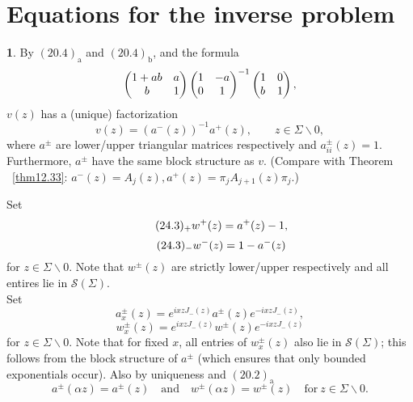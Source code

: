 \documentclass{surv-l}
\theoremstyle{plain}
\theoremstyle{definition}
\newtheorem{definition}[theorem]{\sc{Definition}}
\numberwithin{equation}{chapter}
\begin{document}
\section{Equations for the inverse problem}\label{sec24}
\setcounter{theorem}{0}
\begin{definition}\label{defi24.1}
By $(20.4)_{\mathrm{a}}$ and $(20.4)_{\mathrm{b}}$, and the formula
\begin{equation*}
\left(\begin{array}{@{}cc@{}}
1+ab & a \\
b & 1
\end{array}\right)\left(\begin{array}{@{}cc@{}}
1 & -a\\
0 & 1
\end{array}\right)^{-1} \left(\begin{array}{@{}ll@{}}
1 & 0\\
b & 1
\end{array}\right),
\end{equation*}
$v(z)$ has a (unique) factorization
\renewcommand\theequation{24.2}
\setcounter{equation}{1}
\begin{equation}\label{eq24.2}
v(z)=(a^{-}(z))^{-1}a^{+}(z),\qquad z\in\Sigma\backslash 0,
\end{equation}
where $a^{\pm}$ are lower/upper triangular matrices respectively and $a_{ii}^{\pm}(z)=1$. Furthermore, $a^{\pm}$ have the same block structure as $v$. (Compare with Theorem ~\ref{thm12.33}: $a^{-}(z) =A_{j}(z), a^{+}(z)=\pi_{j}A_{j+1}(z)\pi_{j}.$)

Set
\begin{equation*}
\tag*{$(24.3)_{+}$}  w^{+}(z)=a^{+}(z)-1,
\end{equation*}
\begin{equation*}
\tag*{$(24.3)_{-}$}  w^{-}(z)=1-a^{-}(z)
\end{equation*}
for $z\in\Sigma\backslash0$. Note that $w^{\pm}(z)$ are strictly lower/upper respectively and all entires lie in $\mathscr{S}(\Sigma)$.\\
Set
\renewcommand{\theequation}{\thesection.\arabic{equation}}
\setcounter{equation}{3}
\begin{equation}\label{eq24.4}
a_{x}^{\pm}(z) = e^{ixzJ_{-}(z)}a^{\pm}(z)e^{-ixzJ_{-}(z)},
\end{equation}
\begin{equation}\label{eq24.5}
w_{x}^{\pm}(z) = e^{ixzJ_{-}(z)}w^{\pm}(z)e^{-ixzJ_{-}(z)}
\end{equation}
for $z\in\Sigma\backslash 0$. Note that for fixed $x$, all entries of $w_{x}^{\pm}(z)$ also lie in $\mathscr{S}(\Sigma)$; this follows from the block structure of $a^{\pm}$ (which ensures that only bounded exponentials occur). Also by uniqueness and $(20.2)_{\mathrm{a}}$
\begin{equation}\label{eq24.6}
a^{\pm}(\alpha z)=a^{\pm}(z)\quad \mathrm{and}\quad w^{\pm}(\alpha z)=w^{\pm}(z)\quad \mathrm{for}\ z\in\Sigma\backslash 0.
\end{equation}


\end{definition}
\end{document}
